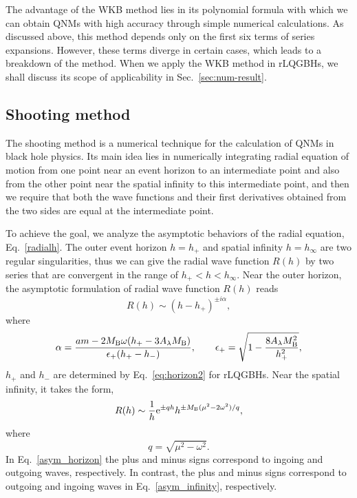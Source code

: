 \documentclass[12pt]{article}
\begin{document}
The advantage of the WKB method lies in its polynomial formula with which we can obtain QNMs with high accuracy through simple numerical calculations. 
As discussed above, this method depends only on the first six terms of series expansions. However, these terms diverge in certain cases, which leads to a breakdown of the method. 
When we apply the WKB method in rLQGBHs, we shall discuss its scope of applicability in Sec.~\ref{sec:num-result}.
    
    
    
    
    
\subsection{Shooting method}\label{shooting}
The shooting method is a numerical technique \cite{Chandrasekhar:1975zza,Franzin:2022iai} for the calculation of QNMs in black hole physics. 
Its main idea lies in numerically integrating radial equation of motion from one  point near an event horizon to an intermediate point and also from the other point near the spatial infinity to this intermediate point,  and then we require that both the wave functions and their first derivatives obtained from the two sides are equal at the intermediate point. 

To achieve the goal, we analyze the asymptotic behaviors of the radial equation, Eq.~\eqref{radialh}. 
The outer event horizon $h=h_+$ and spatial infinity $h=h_\infty$ are two regular singularities, thus we can give the radial wave function $R(h)$ by two  series that are convergent in the range of $h_+<h<h_\infty$.
Near the outer horizon, the asymptotic formulation of radial wave function $R(h)$ reads
\begin{equation}\label{asym_horizon}
    R(h)\sim (h-h_+)^{\pm
    i\alpha},
\end{equation}
where 
\begin{equation}
    \alpha=\frac{a m-2M_{\rm B}\omega( h_+-3A_\lambda M_{\rm B})}{\epsilon_+ (h_+-h_-)}, \qquad \epsilon_+=\sqrt{1-\frac{8A_\lambda M_{\rm B}^2}{h_+^2}},
\end{equation}
$h_+$ and $h_-$ are determined by Eq.~\eqref{eq:horizon2} for rLQGBHs. Near the spatial infinity, it takes the form,
\begin{equation}
    	R(h)\sim \frac{1}{h}\mathrm e^{\pm qh}h^{\pm M_{\rm B}(\mu^2-2\omega^2)/q},\label{asym_infinity}
    \end{equation}
where
\begin{equation}
q=\sqrt{\mu^2-\omega^2}.
\end{equation} 
In Eq.~\eqref{asym_horizon} the plus and minus signs correspond to ingoing and outgoing waves, respectively. In contrast, the plus and minus signs correspond to outgoing and ingoing waves in Eq.~\eqref{asym_infinity}, respectively.
    
\end{document}
